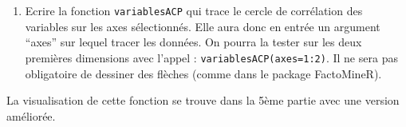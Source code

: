 \documentclass[
]{article}
\newenvironment{Shaded}{\begin{snugshade}}{\end{snugshade}}
\newcommand{\ControlFlowTok}[1]{\textcolor[rgb]{0.13,0.29,0.53}{\textbf{#1}}}
\newcommand{\DecValTok}[1]{\textcolor[rgb]{0.00,0.00,0.81}{#1}}
\newcommand{\FunctionTok}[1]{\textcolor[rgb]{0.00,0.00,0.00}{#1}}
\newcommand{\NormalTok}[1]{#1}
\newcommand{\OtherTok}[1]{\textcolor[rgb]{0.56,0.35,0.01}{#1}}
\newcommand{\SpecialCharTok}[1]{\textcolor[rgb]{0.00,0.00,0.00}{#1}}
\newcommand{\StringTok}[1]{\textcolor[rgb]{0.31,0.60,0.02}{#1}}
\providecommand{\tightlist}{%
  \setlength{\itemsep}{0pt}\setlength{\parskip}{0pt}}
\begin{document}
\begin{enumerate}
\def\labelenumi{\arabic{enumi}.}
\setcounter{enumi}{3}
\tightlist
\item
  Ecrire la fonction \texttt{variablesACP} qui trace le cercle de
  corrélation des variables sur les axes sélectionnés. Elle aura donc en
  entrée un argument ``axes'' sur lequel tracer les données. On pourra
  la tester sur les deux premières dimensions avec l'appel :
  \texttt{variablesACP(axes=1:2)}. Il ne sera pas obligatoire de
  dessiner des flèches (comme dans le package FactoMineR).
\end{enumerate}

La visualisation de cette fonction se trouve dans la 5ème partie avec
une version améliorée.

\begin{Shaded}
\end{Shaded}
\end{document}
